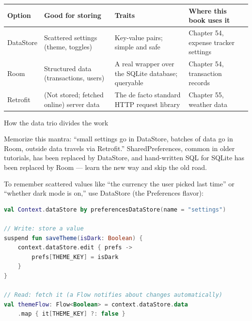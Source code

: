 


\begin{center}
\begin{tabularx}{\linewidth}{|X|X|X|X|}
\hline
\textbf{Option} & \textbf{Good for storing} & \textbf{Traits} & \textbf{Where this book uses it} \tabularnewline
\hline
DataStore & Scattered settings (theme, toggles) & Key-value pairs; simple and safe & Chapter 54, expense tracker settings \tabularnewline
Room & Structured data (transactions, users) & A real wrapper over the SQLite database; queryable & Chapter 54, transaction records \tabularnewline
Retrofit & (Not stored; fetched online) server data & The de facto standard HTTP request library & Chapter 55, weather data \tabularnewline
\hline
\end{tabularx}
\end{center}

\begin{center}\small\color{gray}How the data trio divides the work\end{center}

Memorize this mantra: “small settings go in DataStore, batches of data go in Room, outside data travels via Retrofit.” SharedPreferences, common in older tutorials, has been replaced by DataStore, and hand-written SQL for SQLite has been replaced by Room — learn the new way and skip the old road.


To remember scattered values like “the currency the user picked last time” or “whether dark mode is on,” use DataStore (the Preferences flavor):

\begin{lstlisting}[language=Kotlin]
val Context.dataStore by preferencesDataStore(name = "settings")

// Write: store a value
suspend fun saveTheme(isDark: Boolean) {
    context.dataStore.edit { prefs ->
        prefs[THEME_KEY] = isDark
    }
}

// Read: fetch it (a Flow notifies about changes automatically)
val themeFlow: Flow<Boolean> = context.dataStore.data
    .map { it[THEME_KEY] ?: false }
\end{lstlisting}

